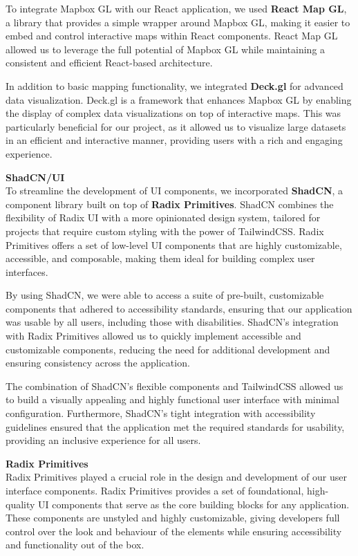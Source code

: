 To integrate Mapbox GL with our React application, we used \textbf{React Map
GL}, a library that provides a simple wrapper around Mapbox GL, making it
easier to embed and control interactive maps within React components. React
Map GL allowed us to leverage the full potential of Mapbox GL while
maintaining a consistent and efficient React{-}based architecture.

In addition to basic mapping functionality, we integrated \textbf{Deck.gl}
for advanced data visualization. Deck.gl is a framework that enhances Mapbox
GL by enabling the display of complex data visualizations on top of
interactive maps. This was particularly beneficial for our project, as it
allowed us to visualize large datasets in an efficient and interactive
manner, providing users with a rich and engaging experience.

\newpage{}

\textbf{ShadCN/UI} \\
To streamline the development of UI components, we incorporated
\textbf{ShadCN}, a component library built on top of \textbf{Radix
Primitives}. ShadCN combines the flexibility of Radix UI with a more
opinionated design system, tailored for projects that require custom styling
with the power of TailwindCSS\@. Radix Primitives offers a set of
low{-}level UI components that are highly customizable, accessible, and
composable, making them ideal for building complex user interfaces.

By using ShadCN, we were able to access a suite of pre{-}built, customizable
components that adhered to accessibility standards, ensuring that our
application was usable by all users, including those with disabilities.
ShadCN's integration with Radix Primitives allowed us to quickly implement
accessible and customizable components, reducing the need for additional
development and ensuring consistency across the application.

The combination of ShadCN's flexible components and TailwindCSS allowed us
to build a visually appealing and highly functional user interface with
minimal configuration. Furthermore, ShadCN's tight integration with
accessibility guidelines ensured that the application met the required
standards for usability, providing an inclusive experience for all users.

\vspace{0.5cm}

\textbf{Radix Primitives} \\
Radix Primitives played a crucial role in the design and development of our
user interface components. Radix Primitives provides a set of foundational,
high{-}quality UI components that serve as the core building blocks for any
application. These components are unstyled and highly customizable, giving
developers full control over the look and behaviour of the elements while
ensuring accessibility and functionality out of the box.

